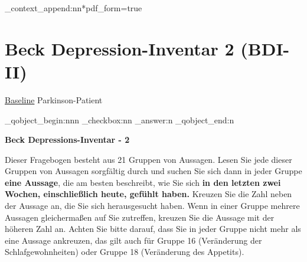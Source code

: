 
\ExplSyntaxOn
\sdaps_context_append:nn{*}{pdf_form=true}
\ExplSyntaxOff

\section{Beck Depression-Inventar 2 (BDI-II)}

\underline{Baseline} Parkinson-Patient \\

\begin{choicequestion}[cols=7]{}
         \end{choicequestion}
\ExplSyntaxOn
\let\myquestionbegin\sdaps_qobject_begin:nnn
\let\mycheckbox\sdaps_checkbox:nn
\let\myanswer\sdaps_answer:n
\let\myquestionend\sdaps_qobject_end:n
\ExplSyntaxOff




\begin{center}
\begin{Large}
\textbf{Beck Depressions-Inventar - 2}
\end{Large}
\end{center}
Dieser Fragebogen besteht aus 21 Gruppen von Aussagen. Lesen Sie jede dieser Gruppen von Aussagen sorgfältig durch und suchen Sie sich dann in jeder Gruppe \textbf{eine Aussage}, die am besten beschreibt, wie Sie sich \textbf{in den letzten zwei Wochen, einschließlich heute, gefühlt haben.} Kreuzen Sie die Zahl neben der Aussage an, die Sie sich herausgesucht haben. Wenn in einer Gruppe mehrere Aussagen gleichermaßen auf Sie zutreffen, kreuzen Sie die Aussage mit der höheren Zahl an. Achten Sie bitte darauf, dass Sie in jeder Gruppe nicht mehr als eine Aussage ankreuzen, das gilt auch für Gruppe 16 (Veränderung der Schlafgewohnheiten) oder Gruppe 18 (Veränderung des Appetits).

